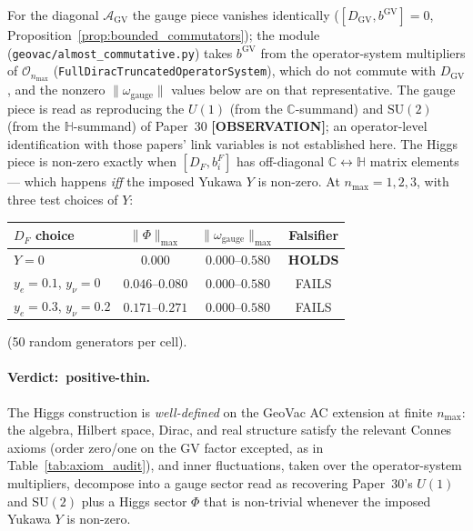 \documentclass[11pt]{article}
\begin{document}
For the diagonal $\mathcal{A}_{\mathrm{GV}}$ the gauge piece vanishes
identically ($[D_{\mathrm{GV}}, b^{\mathrm{GV}}] = 0$,
Proposition~\ref{prop:bounded_commutators}); the module
(\texttt{geovac/almost\_commutative.py}) takes $b^{\mathrm{GV}}$ from
the operator-system multipliers of $\mathcal{O}_{n_{\max}}$
(\texttt{FullDiracTruncatedOperatorSystem}), which do not commute with
$D_{\mathrm{GV}}$, and the nonzero $\|\omega_{\mathrm{gauge}}\|$ values
below are on that representative.  The gauge piece is read as
reproducing the $U(1)$ (from the $\mathbb{C}$-summand) and
$\mathrm{SU}(2)$ (from the $\mathbb{H}$-summand) of Paper~30 \textbf{[OBSERVATION]};
an operator-level identification with those papers' link variables is
not established here.  The Higgs piece is
non-zero exactly when $[D_F, b_i^F]$ has off-diagonal $\mathbb{C}
\leftrightarrow \mathbb{H}$ matrix elements --- which happens
\emph{iff} the imposed Yukawa $Y$ is non-zero.  At
$n_{\max} = 1, 2, 3$, with three test choices of $Y$:

\begin{center}
\begin{tabular}{lccc}
\hline
$D_F$ choice & $\|\Phi\|_{\max}$ & $\|\omega_{\mathrm{gauge}}\|_{\max}$ &
\textbf{Falsifier} \\
\hline
$Y = 0$           &  $0.000$ &  $0.000$--$0.580$ & \textbf{HOLDS}  \\
$y_e = 0.1$, $y_\nu = 0$ & $0.046$--$0.080$ & $0.000$--$0.580$ & FAILS \\
$y_e = 0.3$, $y_\nu = 0.2$ & $0.171$--$0.271$ & $0.000$--$0.580$ & FAILS \\
\hline
\end{tabular}
\end{center}

(50 random generators per cell).

\paragraph{Verdict:\ positive-thin.}  The Higgs construction is
\emph{well-defined} on the GeoVac AC extension at finite $n_{\max}$:
the algebra, Hilbert space, Dirac, and real structure satisfy the
relevant Connes axioms (order zero/one on the GV factor excepted, as
in Table~\ref{tab:axiom_audit}), and inner fluctuations, taken over
the operator-system multipliers, decompose into a gauge sector read as
recovering Paper~30's $U(1)$ and $\mathrm{SU}(2)$ plus a Higgs sector $\Phi$ that
is non-trivial whenever the imposed Yukawa $Y$ is non-zero.
\end{document}
